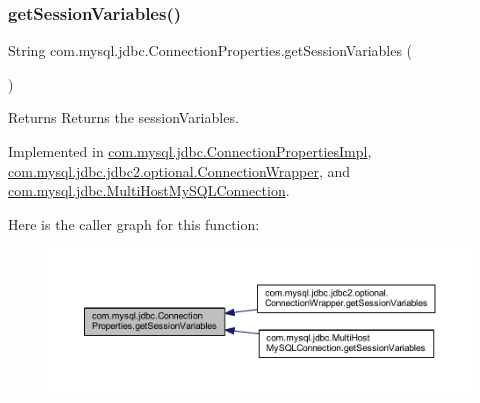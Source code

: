 \subsubsection{\texorpdfstring{get\+Session\+Variables()}{getSessionVariables()}}
{\footnotesize\ttfamily String com.\+mysql.\+jdbc.\+Connection\+Properties.\+get\+Session\+Variables (\begin{DoxyParamCaption}{ }\end{DoxyParamCaption})}

\begin{DoxyReturn}{Returns}
Returns the session\+Variables. 
\end{DoxyReturn}


Implemented in \mbox{\hyperlink{classcom_1_1mysql_1_1jdbc_1_1_connection_properties_impl_a923b692f97529931ec6f85a2e2e66249}{com.\+mysql.\+jdbc.\+Connection\+Properties\+Impl}}, \mbox{\hyperlink{classcom_1_1mysql_1_1jdbc_1_1jdbc2_1_1optional_1_1_connection_wrapper_ac7004dec3742a421e0d6e275647eb34f}{com.\+mysql.\+jdbc.\+jdbc2.\+optional.\+Connection\+Wrapper}}, and \mbox{\hyperlink{classcom_1_1mysql_1_1jdbc_1_1_multi_host_my_s_q_l_connection_a45d2ffee7d7d90c114e6b15180c7ebaf}{com.\+mysql.\+jdbc.\+Multi\+Host\+My\+S\+Q\+L\+Connection}}.

Here is the caller graph for this function\+:\nopagebreak
\begin{figure}[H]
\begin{center}
\leavevmode
\includegraphics[width=350pt]{interfacecom_1_1mysql_1_1jdbc_1_1_connection_properties_ad63fb7021671197a1bdf1d314420a224_icgraph}
\end{center}
\end{figure}
\mbox{\label{interfacecom_1_1mysql_1_1jdbc_1_1_connection_properties_a6c2698e485ad9ad410bceff09e3835f0}} 
